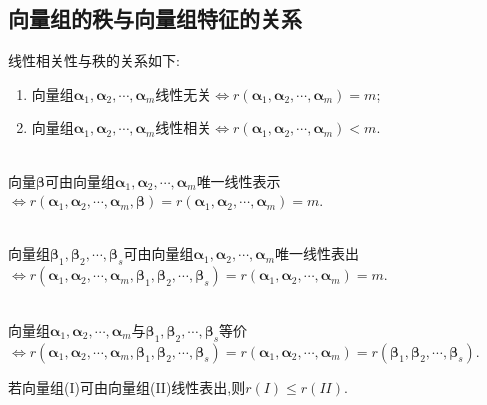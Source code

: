 \documentclass[9pt,a4paper]{book}
\begin{document}
\subsection{向量组的秩与向量组特征的关系}
\begin{feature}
	线性相关性与秩的关系如下:
	\begin{enumerate}
		\item 向量组$  \bm{\alpha}_1,\bm{\alpha}_2,\cdots,\bm{\alpha}_m $线性无关$ \Leftrightarrow r( \bm{\alpha}_1,\bm{\alpha}_2,\cdots,\bm{\alpha}_m)=m $;
		\item 向量组$  \bm{\alpha}_1,\bm{\alpha}_2,\cdots,\bm{\alpha}_m $线性相关$ \Leftrightarrow r( \bm{\alpha}_1,\bm{\alpha}_2,\cdots,\bm{\alpha}_m)<m $.
	\end{enumerate}
\end{feature}
\begin{feature}
	\,\\
	
	向量$ \bm{\beta} $可由向量组$  \bm{\alpha}_1,\bm{\alpha}_2,\cdots,\bm{\alpha}_m $唯一线性表示$ \Leftrightarrow r( \bm{\alpha}_1,\bm{\alpha}_2,\cdots,\bm{\alpha}_m,\bm{\beta}) =r( \bm{\alpha}_1,\bm{\alpha}_2,\cdots,\bm{\alpha}_m)=m$.
\end{feature}
\begin{feature}
	\,\\
	
	向量组$ \bm{\beta}_1,\bm{\beta}_2,\cdots,\bm{\beta}_s $可由向量组$  \bm{\alpha}_1,\bm{\alpha}_2,\cdots,\bm{\alpha}_m $唯一线性表出$ \Leftrightarrow r( \bm{\alpha}_1,\bm{\alpha}_2,\cdots,\bm{\alpha}_m ,\bm{\beta}_1,\bm{\beta}_2,\cdots,\bm{\beta}_s)=r(\bm{\alpha}_1,\bm{\alpha}_2,\cdots,\bm{\alpha}_m)=m$.
\end{feature}
\begin{feature}
	\,\\
	
	向量组$  \bm{\alpha}_1,\bm{\alpha}_2,\cdots,\bm{\alpha}_m $与$ \bm{\beta}_1,\bm{\beta}_2,\cdots,\bm{\beta}_s $等价$ \Leftrightarrow r(\bm{\alpha}_1,\bm{\alpha}_2,\cdots,\bm{\alpha}_m ,\bm{\beta}_1,\bm{\beta}_2,\cdots,\bm{\beta}_s)=r(\bm{\alpha}_1,\bm{\alpha}_2,\cdots,\bm{\alpha}_m)=r(\bm{\beta}_1,\bm{\beta}_2,\cdots,\bm{\beta}_s)$.
\end{feature}
\begin{feature}
	若向量组(I)可由向量组(II)线性表出,则$ r(I)\leqslant r(II) $.
\end{feature}
\end{document}
